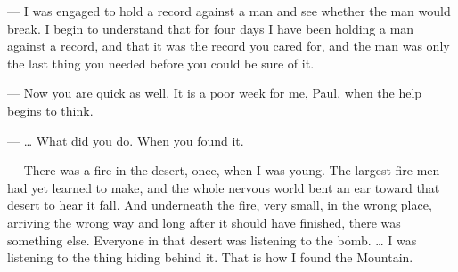 \begin{room}
--- I was engaged to hold a record against a man and see whether the man would break. I begin to understand that for four days I have been holding a man against a record, and that it was the record you cared for, and the man was only the last thing you needed before you could be sure of it.

--- Now you are quick as well. It is a poor week for me, Paul, when the help begins to think.

--- \ldots{} What did you do. When you found it.

--- There was a fire in the desert, once, when I was young. The largest fire men had yet learned to make, and the whole nervous world bent an ear toward that desert to hear it fall. And underneath the fire, very small, in the wrong place, arriving the wrong way and long after it should have finished, there was something else. Everyone in that desert was listening to the bomb. \ldots{} I was listening to the thing hiding behind it. That is how I found the Mountain.

\end{room}
